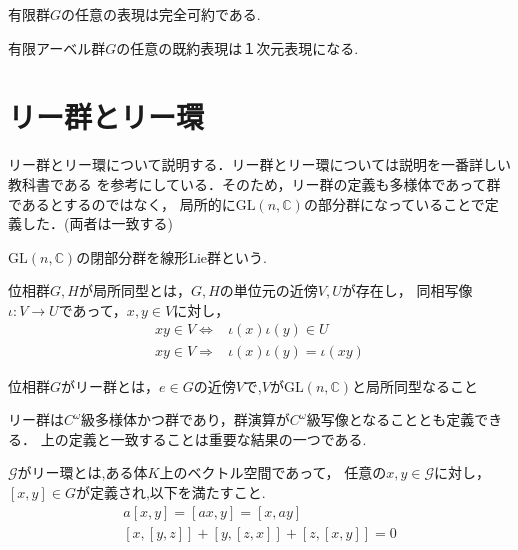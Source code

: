 \documentclass{ujarticle}
\begin{document}
\begin{prop}
 有限群$G$の任意の表現は完全可約である.
\end{prop}

\begin{prop}
 有限アーベル群$G$の任意の既約表現は１次元表現になる.
\end{prop}



\section{リー群とリー環}
\label{sec:リー群とリー環}
リー群とリー環について説明する．リー群とリー環については説明を一番詳しい教科書である
\cite{KO}を参考にしている．そのため，リー群の定義も多様体であって群であるとするのではなく，
局所的に$\mathrm{GL}(n,\mathbb{C})$の部分群になっていることで定義した．(両者は一致する)
\begin{dfn}[線形Lie群]
$\mathrm{GL}(n,\mathbb{C})$の閉部分群を線形Lie群という.
\end{dfn}

\begin{dfn}[局所同型]
位相群$G,H$が局所同型とは，$G,H$の単位元の近傍$V,U$が存在し，
同相写像$\iota:V \to U$であって，$x,y \in V$に対し，
\begin{align*}
  xy \in V  \Leftrightarrow & \iota(x)\iota(y) \in U \\
  xy \in V  \Rightarrow & \iota(x)\iota(y)=\iota(xy)
\end{align*}
\end{dfn}

\begin{dfn}[リー群]
位相群$G$がリー群とは，$e \in G$の近傍$V$で,$V$が$\mathrm{GL}(n,\mathbb{C})$と局所同型なること
\end{dfn}
\begin{rem}
 リー群は$C^{\omega}$級多様体かつ群であり，群演算が$C^{\omega}$級写像となることとも定義できる．
 上の定義と一致することは重要な結果の一つである.
\end{rem}

\begin{dfn}[リー環]
$\mathcal{G}$がリー環とは,ある体$K$上のベクトル空間であって，
任意の$x,y\in \mathcal{G}$に対し，$[x,y] \in G$が定義され,以下を満たすこと.
\begin{align}
  a[x,y]=[ax,y]=[x,ay] \\
  [x,[y,z]]+[y,[z,x]]+[z,[x,y]]=0
\end{align}
\end{dfn}
\end{document}
